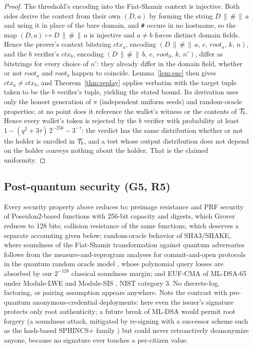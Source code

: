 \documentclass[11pt]{article}
\theoremstyle{definition}
\begin{document}
\begin{proof}
The threshold's encoding into the Fiat-Shamir context is injective. Both sides derive the
context from their own $(D, a)$ by forming the string $D \,\|\, \texttt{\#} \,\|\, a$ and
using it in place of the bare domain, and \texttt{\#} occurs in no hostname, so the map
$(D, a) \mapsto D \,\|\, \texttt{\#} \,\|\, a$ is injective and $a \ne b$ forces distinct
domain fields. Hence the prover's context bitstring $\mathit{ctx}_a$, encoding $(D
\,\|\, \texttt{\#} \,\|\, a,\, e,\, \mathit{root}_a,\, k,\, n)$, and the $b$ verifier's
$\mathit{ctx}_b$, encoding $(D \,\|\, \texttt{\#} \,\|\, b,\, e,\, \mathit{root}_b,\, k,\,
n')$, differ as bitstrings for every choice of $n'$: they already differ in the domain
field, whether or not $\mathit{root}_a$ and $\mathit{root}_b$ happen to coincide.
Lemma~\ref{lem:enc} then gives $\mathit{ctx}_a \ne \mathit{ctx}_b$, and
Theorem~\ref{thm:replay} applies verbatim with the target tuple taken to be the $b$
verifier's tuple, yielding the stated bound. Its derivation uses only the honest
generation of $\pi$ (independent uniform seeds) and random-oracle properties; at no point
does it reference the wallet's witness or the contents of $\mathcal{T}_b$. Hence every wallet's
token is rejected by the $b$ verifier with probability at least $1 - (q^2 +
3\tau)\,2^{-256} - 3^{-\tau}$: the verdict has the same distribution whether or not the
holder is enrolled in $\mathcal{T}_b$, and a test whose output distribution does not depend on
the holder conveys nothing about the holder. That is the claimed uniformity.
\end{proof}

\subsection{Post-quantum security (G5, R5)}
\label{sec:pq}

Every security property above reduces to: preimage resistance and PRF security of
Poseidon2-based functions with 256-bit capacity and digests, which Grover \cite{grover}
reduces to 128 bits; collision resistance of the same functions, which deserves a separate
accounting given below; random-oracle behavior of SHA3/SHAKE, where soundness of the
Fiat-Shamir transformation against quantum adversaries follows from the
measure-and-reprogram analyses for commit-and-open protocols in the quantum random oracle
model \cite{qromfs}, whose polynomial query losses are absorbed by our $2^{-128}$
classical soundness margin; and EUF-CMA of ML-DSA-65 under Module-LWE and Module-SIS
\cite{regev,dilithium}, NIST category 3. No discrete-log, factoring, or pairing assumption
appears anywhere. Note the contrast with pre-quantum anonymous-credential deployments:
here even the issuer's signature protects only root authenticity; a future break of ML-DSA
would permit root forgery (a soundness attack, mitigated by re-signing with a successor
scheme such as the hash-based SPHINCS+ family \cite{sphincs}) but could never
retroactively deanonymize anyone, because no signature ever touches a per-citizen value.
\end{document}
